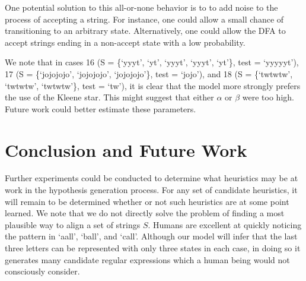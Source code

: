 \documentclass[10pt,letterpaper]{article}
\begin{document}
One potential solution to this all-or-none behavior is to to add noise to the process of accepting a string. For instance, one could allow a small chance of transitioning to an arbitrary state. Alternatively, one could allow the DFA to accept strings ending in a non-accept state with a low probability. 

We note that in cases 16 (S = \{`yyyt', `yt', `yyyt', `yyyt', `yt'\}, test = `yyyyyt'), 17 (S = \{`jojojojo', `jojojojo', `jojojojo'\}, test = `jojo'), and 18 (S = \{`twtwtw', `twtwtw', `twtwtw'\}, test =  `tw'), it is clear that the model more strongly prefers the use of the Kleene star. This might suggest that either $\alpha$ or $\beta$ were too high. Future work could better estimate these parameters.

\section{Conclusion and Future Work}

Further experiments could be conducted to determine what heuristics may be at work in the hypothesis generation process. For any set of candidate heuristics, it will remain to be determined whether or not such heuristics are at some point learned. We note that we do not directly solve the problem of finding a most plausible way to align a set of strings $S$. Humans are excellent at quickly noticing the pattern in `aall', `ball', and `call'. Although our model will infer that the last three letters can be represented with only three states in each case, in doing so it generates many candidate regular expressions which a human being would not consciously consider.  
\end{document}
